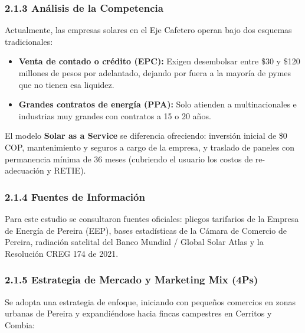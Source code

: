 \documentclass[12pt,letterpaper]{article}
\begin{document}
\subsubsection{2.1.3 Análisis de la Competencia}

Actualmente, las empresas solares en el Eje Cafetero operan bajo dos esquemas tradicionales:
\begin{itemize}[leftmargin=1.5em, itemsep=2pt]
    \item \textbf{Venta de contado o crédito (EPC):} Exigen desembolsar entre \$30 y \$120 millones de pesos por adelantado, dejando por fuera a la mayoría de pymes que no tienen esa liquidez.
    \item \textbf{Grandes contratos de energía (PPA):} Solo atienden a multinacionales e industrias muy grandes con contratos a 15 o 20 años.
\end{itemize}

El modelo \textbf{Solar as a Service} se diferencia ofreciendo: inversión inicial de \$0 COP, mantenimiento y seguros a cargo de la empresa, y traslado de paneles con permanencia mínima de 36 meses (cubriendo el usuario los costos de re-adecuación y RETIE).

\subsubsection{2.1.4 Fuentes de Información}

Para este estudio se consultaron fuentes oficiales: pliegos tarifarios de la Empresa de Energía de Pereira (EEP), bases estadísticas de la Cámara de Comercio de Pereira, radiación satelital del Banco Mundial / Global Solar Atlas y la Resolución CREG 174 de 2021.

\subsubsection{2.1.5 Estrategia de Mercado y Marketing Mix (4Ps)}

Se adopta una estrategia de enfoque, iniciando con pequeños comercios en zonas urbanas de Pereira y expandiéndose hacia fincas campestres en Cerritos y Combia:
\end{document}
